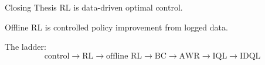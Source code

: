 \begin{frame}{Closing Thesis}
  \Large
  RL is data-driven optimal control.

  \vspace{0.5cm}
  Offline RL is controlled policy improvement from logged data.

  \vspace{0.5cm}
  \normalsize
  The ladder:
  \[
    \text{control} \rightarrow \text{RL} \rightarrow \text{offline RL}
    \rightarrow \text{BC} \rightarrow \text{AWR} \rightarrow \text{IQL} \rightarrow \text{IDQL}
  \]
\end{frame}
